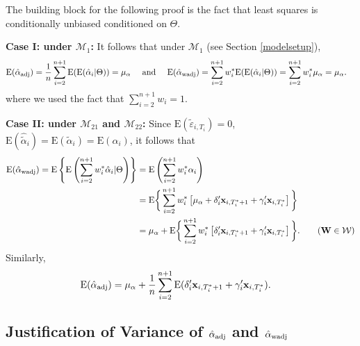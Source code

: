 \documentclass[11pt]{article}
\def\mbf#1{\mathbf{#1}} %
\def\mrm#1{\mathrm{#1}} %
\def\mc#1{\mathcal{#1}} %
\def\E#1{\mathrm{E}(#1)} %
\theoremstyle{definition}
\begin{document}
The building block for the following proof is the fact that least squares is conditionally unbiased conditioned on $\Theta$. 

\noindent \textbf{Case I: under $\mc{M}_{1}$:} It follows that  under $\mc{M}_{1}$ (see Section \ref{modelsetup}),
\begin{align*}
\E{\hat{\alpha}_{\rm adj}} =\frac{1}{n}  \sum_{i=2}^{n+1} \E{\E{\hat{\alpha}_i|\Theta}} = \mu_{\alpha} 
\quad \text{ and } \quad \E{\hat{\alpha}_{\rm wadj}}&= \sum_{i=2}^{n+1} w_i^* \E{\E{\hat{\alpha}_i|\Theta}}= \sum_{i=2}^{n+1} w_i^*\mu_{\alpha}= \mu_{\alpha}.
\end{align*}
where we used the fact that $\sum_{i=2}^{n+1} w_i=1$. 

\noindent \textbf{Case II: under $\mc{M}_{21}$ and $\mc{M}_{22}$:} Since $\E{\tilde{\varepsilon}_{i, T_i}}=0$, $\E{\hat{\tilde{\alpha}}_{i}}=\E{\tilde{\alpha}_{i}}=\E{\alpha_{i}}$, it follows that
  \begin{align*}
   \E{\hat{\alpha}_{\rm wadj}}= \mrm{E}\left\{\mrm{E}\left(\sum_{i=2}^{n+1} w_i^*\hat{\alpha}_i|\Theta\right)\right\}
   &= \mrm{E}\left( \sum_{i=2}^{n+1} w_i^*\alpha_i\right)\\
   &= \mrm{E}\bigg\{ \sum_{i=2}^{n+1} w_i^*\left[\mu_{\alpha}+\delta_{i}'\mbf{x}_{i, T_i^*+1}+\gamma_i'\mbf{x}_{i, T^*_i}\right]\bigg\}\\
   &=\mu_{\alpha}+\mrm{E}\bigg\{ \sum_{i=2}^{n+1} w_i^*\left[\delta_{i}'\mbf{x}_{i, T_i^*+1}+\gamma_i'\mbf{x}_{i, T^*_i}\right]\bigg\}.\tag{$\mbf{W}\in \mc{W}$}
   \end{align*}
Similarly,
  \begin{align*}
   \E{\hat{\alpha}_{\rm adj}}
   &=\mu_{\alpha}+\frac{1}{n}\sum_{i=2}^{n+1} \E{\delta_{i}'\mbf{x}_{i, T_i^*+1}+\gamma_i'\mbf{x}_{i, T^*_i}}.
   \end{align*}


\subsection{Justification of Variance of $\hat{\alpha}_{\rm adj}$ and $\hat{\alpha}_{\rm wadj}$}
\label{var}
\end{document}

